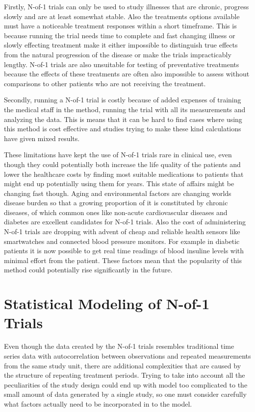 \documentclass[12pt,a4paper,leqno]{report}
\theoremstyle{plain}
\theoremstyle{definition}
\theoremstyle{remark}
\begin{document}
Firstly, N-of-1 trials can only be used to study illnesses that are chronic, progress
slowly and are at least somewhat stable. Also the treatments options available
must have a noticeable treatment responses within a short timeframe. This is because
running the trial needs time to complete and fast changing illness or slowly effecting
treatment make it either impossible to distinguish true effects from the natural progression
of the disease or make the trials impracticably lengthy. N-of-1 trials are also unsuitable for
testing of preventative treatments because the effects of these
treatments are often also impossible to assess without comparisons to other
patients who are not receiving the treatment.

Secondly, running a N-of-1 trial is costly because of added expenses of training the
medical staff in the method, running the trial with all its measurements and analyzing
the data. This is means that it can be hard to find cases where using this method is
cost effective and studies trying to make these kind calculations have given mixed results\cite{costs}.

These limitations have kept the use of N-of-1 trials rare in clinical use,
even though they could potentially both increase the life quality of the patients
and lower the healthcare costs by finding most suitable medications to patients that
might end up potentially using them for years. This state of affairs might
be changing fast though. Aging and environmental factors are changing worlds
disease burden so that a growing proportion of it is constituted by
chronic diseases\cite{diseaseburden}, of which common ones like non-acute
cardiovascular diseases and diabetes are excellent candidates for N-of-1
trials. Also the cost of administering N-of-1 trials are dropping with advent of
cheap and reliable health sensors like smartwatches and connected blood
pressure monitors. For example in diabetic patients it is now possible to get
real time readings of blood insuline levels with minimal effort from the
patient\cite{cgm}. These factors mean that the popularity of this method could potentially
rise significantly in the future.

\chapter{Statistical Modeling of N-of-1 Trials}\label{modeling}

Even though the data created by the N-of-1 trials resembles traditional time
series data with autocorrelation between observations and repeated measurements
from the same study unit, there are additional complexities that are caused by the
structure of repeating treatment periods. Trying to take into account all the
peculiarities of the study design could end up with model too complicated to
the small amount of data generated by a single study, so one must consider
carefully what factors actually need to be incorporated in to the model.
\end{document}
